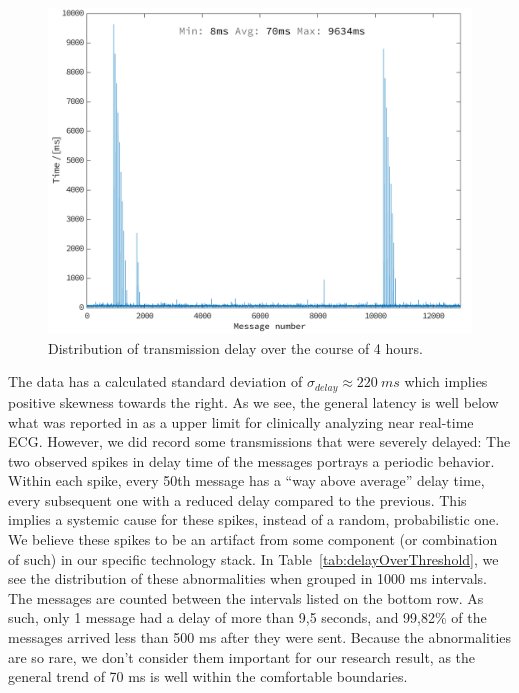 

\begin{figure}[H]
\centering
\includegraphics[scale=0.24]{img/figures/end-to-end2.png}
\caption{Distribution of transmission delay over the course of 4 hours.}
\label{fig:endToEndPlot}
\end{figure}
\noindent
The data has a calculated standard deviation of $\sigma_{delay} \approx {220}\:ms$ which implies positive skewness towards the right. As we see, the general latency is well below what was reported in \cite{Alesanco:2010kc} as a upper limit for clinically analyzing near real-time ECG. However, we did record some transmissions that were severely delayed: The two observed spikes in delay time of the messages portrays a periodic behavior. Within each spike, every 50th message has a ``way above average'' delay time, every subsequent one with a reduced delay compared to the previous. This implies a systemic cause for these spikes, instead of a random, probabilistic one. We believe these spikes to be an artifact from some component (or combination of such) in our specific technology stack. In Table~\ref{tab:delayOverThreshold}, we see the distribution of these abnormalities when grouped in 1000 ms intervals. The messages are counted between the intervals listed on the bottom row. As such, only 1 message had a delay of more than 9,5 seconds, and 99,82\% of the messages arrived less than 500 ms after they were sent. Because the abnormalities are so rare, we don't consider them important for our research result, as the general trend of 70 ms is well within the comfortable boundaries.


